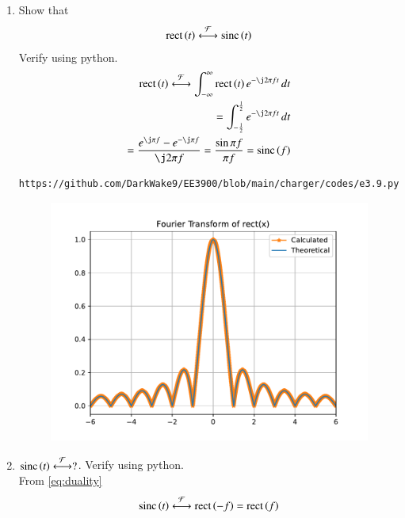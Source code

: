 \documentclass[journal,12pt,twocolumn]{IEEEtran}
\renewcommand\thesection{\arabic{section}}
\begin{document}
\begin{enumerate}[label=\thesection.\arabic*
,ref=\thesection.\theenumi]
\begin{figure}[!ht]
\begin{center}
	\end{center}
	\label{fig:}	
\end{figure}
\vspace{4cm}
 \item Show that 
 \begin{align}
	 \text{rect}\left(t\right) \overset{\mathcal{F}}{ \longleftrightarrow} \text{sinc}\left(t\right)
 \end{align}
 Verify using python.\\
\solution 
\begin{align}
	\rect{t}\system{F}\int_{-\infty}^{\infty}\rect{t}e^{-\j2\pi ft}\, dt \\
	=\int_{-\frac{1}{2}}^{\frac{1}{2}}e^{-\j2\pi ft}\, dt \\
	=\frac{e^{\j\pi f} - e^{-\j\pi f}}{\j2\pi f} = \frac{\sin{\pi f}}{\pi f} = \sinc{f}
	\label{eq:fourier-rect}
\end{align}		
\begin{lstlisting}
https://github.com/DarkWake9/EE3900/blob/main/charger/codes/e3.9.py
\end{lstlisting}
\begin{figure}[!ht]
	\begin{center}
		\includegraphics[width=\columnwidth]{./figs/e3.9.pdf}
	\end{center}
	\label{fig:}	
\end{figure}
 \item 
$	 \text{sinc}\left(t\right)\overset{\mathcal{F}}{ \longleftrightarrow} ?$.  Verify using python.\\
\solution From \eqref{eq:duality}
\begin{align}
	\sinc{t}\system{F}\rect{-f}=\rect{f}
	\label{eq:fourier-sinc}

\end{align}
\end{enumerate}
\end{document}
